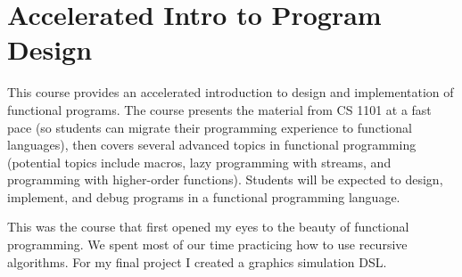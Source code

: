 \section{Accelerated Intro to Program Design}

\begin{meta}
\end{meta}


\coursedesc
This course provides an accelerated introduction to design and
implementation of functional programs. The course presents the material
from CS 1101 at a fast pace (so students can migrate their programming
experience to functional languages), then covers several advanced
topics in functional programming (potential topics include macros, lazy
programming with streams, and programming with higher-order functions).
Students will be expected to design, implement, and debug programs in a
functional programming language.

\courseself
This was the course that first opened my eyes to the beauty of
functional programming. We spent most of our time practicing how to
use recursive algorithms. For my final project I created a graphics
simulation DSL.

